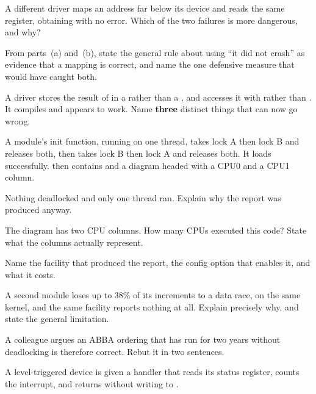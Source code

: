  A different driver maps an address far below its device and reads the same register,
obtaining  with no error. Which of the two failures is more dangerous, and why? 

 From parts~(a) and~(b), state the general rule about using ``it did not crash''
as evidence that a mapping is correct, and name the one defensive measure that would have caught
both. 

 A driver stores the result of  in a  rather than a , and accesses it with  rather than . It compiles and appears to
work. Name \textbf{three} distinct things that can now go wrong. 

\label{exb:q:7}

A module's init function, running on one thread, takes lock A then lock B and releases both, then
takes lock B then lock A and releases both. It loads successfully.  then contains
 and a diagram headed  with a CPU0 and a CPU1 column.

 Nothing deadlocked and only one thread ran. Explain why the report was produced anyway. 

 The diagram has two CPU columns. How many CPUs executed this code? State what the columns
actually represent. 

 Name the facility that produced the report, the config option that enables it, and what it
costs. 

 A second module loses up to 38\% of its increments to a data race, on the same kernel, and
the same facility reports nothing at all. Explain precisely why, and state the general limitation. 

 A colleague argues an ABBA ordering that has run for two years without deadlocking is
therefore correct. Rebut it in two sentences. 

\label{exb:q:8}

A level-triggered device is given a handler that reads its status register, counts the interrupt,
and returns  without writing to .

